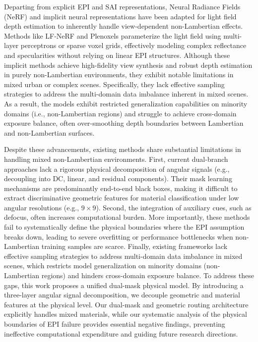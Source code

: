 \documentclass[lettersize,journal]{IEEEtran}
\begin{document}
Departing from explicit EPI and SAI representations, Neural Radiance Fields (NeRF) and implicit neural representations have been adapted for light field depth estimation to inherently handle view-dependent non-Lambertian effects. Methods like LF-NeRF and Plenoxels \cite{ng2005} parameterize the light field using multi-layer perceptrons or sparse voxel grids, effectively modeling complex reflectance and specularities without relying on linear EPI structures. Although these implicit methods achieve high-fidelity view synthesis and robust depth estimation in purely non-Lambertian environments, they exhibit notable limitations in mixed urban or complex scenes. Specifically, they lack effective sampling strategies to address the multi-domain data imbalance inherent in mixed scenes. As a result, the models exhibit restricted generalization capabilities on minority domains (i.e., non-Lambertian regions) and struggle to achieve cross-domain exposure balance, often over-smoothing depth boundaries between Lambertian and non-Lambertian surfaces.

Despite these advancements, existing methods share substantial limitations in handling mixed non-Lambertian environments. First, current dual-branch approaches lack a rigorous physical decomposition of angular signals (e.g., decoupling into DC, linear, and residual components). Their mask learning mechanisms are predominantly end-to-end black boxes, making it difficult to extract discriminative geometric features for material classification under low angular resolutions (e.g., $9 \times 9$). Second, the integration of auxiliary cues, such as defocus, often increases computational burden. More importantly, these methods fail to systematically define the physical boundaries where the EPI assumption breaks down, leading to severe overfitting or performance bottlenecks when non-Lambertian training samples are scarce. Finally, existing frameworks lack effective sampling strategies to address multi-domain data imbalance in mixed scenes, which restricts model generalization on minority domains (non-Lambertian regions) and hinders cross-domain exposure balance. To address these gaps, this work proposes a unified dual-mask physical model. By introducing a three-layer angular signal decomposition, we decouple geometric and material features at the physical level. Our dual-mask and geometric routing architecture explicitly handles mixed materials, while our systematic analysis of the physical boundaries of EPI failure provides essential negative findings, preventing ineffective computational expenditure and guiding future research directions.
\end{document}
